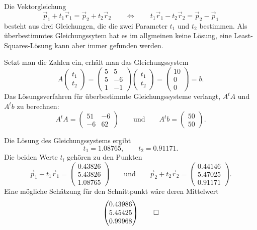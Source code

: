 \begin{loesung}
\begin{teilaufgaben}
\item
Die Vektorgleichung
\[
\vec p_1+t_1\vec r_1 = \vec p_2 + t_2\vec r_2
\qquad\Leftrightarrow\qquad
t_1\vec r_1 - t_2\vec r_2 = \vec p_2 -\vec p_1
\]
besteht aus drei Gleichungen, die die zwei Parameter $t_1$ und $t_2$ 
bestimmen. 
Als überbestimmtes Gleichungssytem hat es im allgmeinen keine
Lösung, eine Least-Squares-Lösung kann aber immer gefunden werden.

Setzt man die Zahlen ein, erhält man das Gleichungssystem
\[
A
\begin{pmatrix}
t_1\\t_2
\end{pmatrix}
=
\begin{pmatrix}
5& 5\\
5&-6\\
1&-1
\end{pmatrix}
\begin{pmatrix}
t_1\\t_2
\end{pmatrix}
=
\begin{pmatrix}
10\\0\\0
\end{pmatrix}
=
b.
\]
Das Lösungsverfahren für überbestimmte Gleichungssysteme verlangt,
$A^tA$ und $A^tb$ zu berechnen:
\[
A^tA=\begin{pmatrix}51&-6\\-6&62\end{pmatrix}
\qquad\text{und}\qquad
A^tb=\begin{pmatrix}50\\50\end{pmatrix}.
\]
\item
Die Lösung des Gleichungssystems ergibt
\[
t_1 = 1.08765,
\qquad
t_2 = 0.91171.
\]
Die beiden Werte $t_i$ gehören zu den Punkten
\[
\vec p_1+t_1\vec r_1
=
\begin{pmatrix}
   0.43826\\
   5.43826\\
   1.08765
\end{pmatrix}
\qquad\text{und}\qquad
\vec p_2+t_2\vec r_2
=
\begin{pmatrix}
   0.44146\\
   5.47025\\
   0.91171
\end{pmatrix}.
\]
Eine mögliche Schätzung für den Schnittpunkt wäre deren Mittelwert
\begin{equation}
\begin{pmatrix}
   0.43986\\
   5.45425\\
   0.99968
\end{pmatrix}
\label{40000017:loes}
\qedhere
\end{equation}
\end{teilaufgaben}
\end{loesung}

